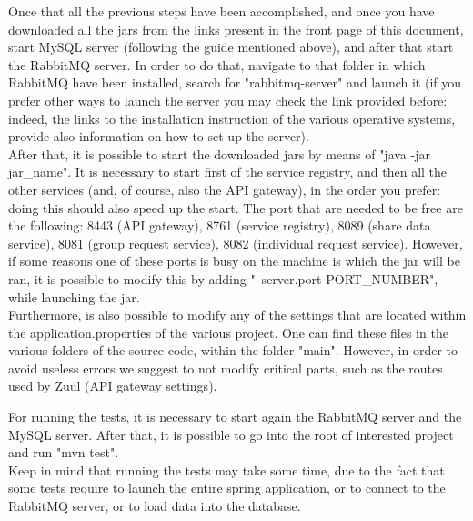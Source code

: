 Once that all the previous steps have been accomplished, and once you have downloaded all the jars from the links present in the front page
of this document, start MySQL server (following the guide mentioned above), and after that start the RabbitMQ server. In order to do that, 
navigate to that folder in which RabbitMQ have been installed, search for "rabbitmq-server" and launch it (if you prefer other ways to launch
the server you may check the link provided before: indeed, the links to the installation instruction of the various operative systems,
provide also information on how to set up the server). \\
After that, it is possible to start the downloaded jars by means of "java -jar jar\_name". 
It is necessary to start first of the service registry, and then all the other services (and, of course, also the API gateway), in the
order you prefer: doing this should also speed up the start. 
The port that are needed to be free are the following: 8443 (API gateway), 8761 (service registry), 8089 (share data service), 8081 (group
request service), 8082 (individual request service). However, if some reasons one of these ports is busy on the
machine is which the jar will be ran, it is possible to modify this by adding "--server.port PORT\_NUMBER", while launching the jar. \\
Furthermore, is also possible to modify any of the settings that are located within the application.properties of the various project.
One can find these files in the various folders of the source code, within the folder "main". However, in order to avoid useless errors
we suggest to not modify critical parts, such as the routes used by Zuul (API gateway settings). \\

\par 
For running the tests, it is necessary to start again the RabbitMQ server and the MySQL server. After that, it is possible to go into
the root of interested project and run "mvn test". \\
Keep in mind that running the tests may take some time, due to the fact that some tests require to launch the entire spring application,
or to connect to the RabbitMQ server, or to load data into the database. 

